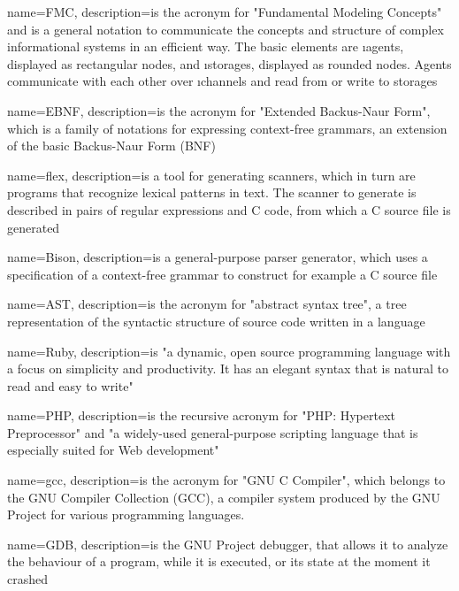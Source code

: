 {
	name={FMC},
	description={is the acronym for "Fundamental Modeling Concepts" and is a general notation to communicate the concepts and structure of complex informational systems in an efficient way. The basic elements are \i{agents}, displayed as rectangular nodes, and \i{storages}, displayed as rounded nodes. Agents communicate with each other over \i{channels} and read from or write to storages \citep{glfmc}}
}

{
	name={EBNF},
	description={is the acronym for "Extended Backus-Naur Form", which is a family of notations for expressing context-free grammars, an extension of the basic Backus-Naur Form (BNF) \citep{glebnf}}
}

{
	name={flex},
	description={is a tool for generating scanners, which in turn are programs that recognize lexical patterns in text. The scanner to generate is described in pairs of regular expressions and C code, from which a C source file is generated \citep{glflex}}
}

{
	name={Bison},
	description={is a general-purpose parser generator, which uses a specification of a context-free grammar to construct for example a C source file \citep{glbison}}
}

{
	name={AST},
	description={is the acronym for "abstract syntax tree", a tree representation of the syntactic structure of source code written in a language \citep{glast}}
}

{
	name={Ruby},
	description={is "a dynamic, open source programming language with a focus on simplicity and productivity. It has an elegant syntax that is natural to read and easy to write" \citep{glruby}}
}

{
	name={PHP},
	description={is the recursive acronym for "PHP: Hypertext Preprocessor" and "a widely-used general-purpose scripting language that is especially suited for Web development" \citep{glphp}}
}

{
	name={gcc},
	description={is the acronym for "GNU C Compiler", which belongs to the GNU Compiler Collection (GCC), a compiler system produced by the GNU Project for various programming languages. \citep{glgcc}}
}

{
	name={GDB},
	description={is the GNU Project debugger, that allows it to analyze the behaviour of a program, while it is executed, or its state at the moment it crashed \citep{glgdb}}
}

